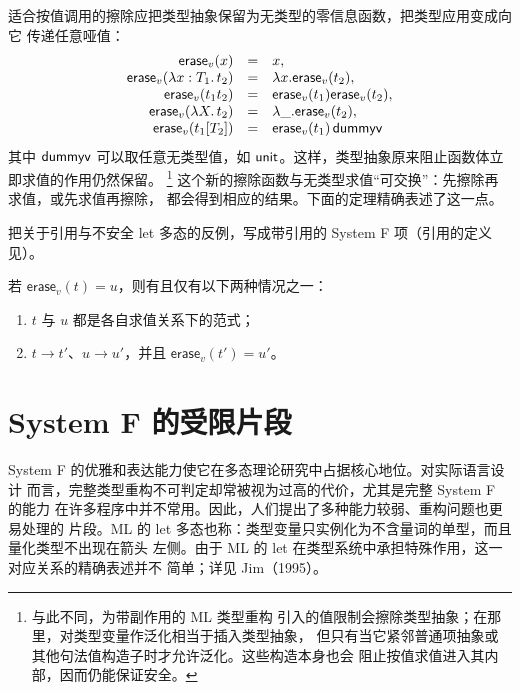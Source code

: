 适合按值调用的擦除应把类型抽象保留为无类型的零信息函数，把类型应用变成向它
传递任意哑值：
\[
\begin{array}{rcl}
\mathsf{erase}_v(x)&=&x,\\
\mathsf{erase}_v(\lambda x:T_1.\,t_2)&=&\lambda x.\mathsf{erase}_v(t_2),\\
\mathsf{erase}_v(t_1t_2)&=&\mathsf{erase}_v(t_1)\mathsf{erase}_v(t_2),\\
\mathsf{erase}_v(\lambda X.\,t_2)&=&\lambda\_.\mathsf{erase}_v(t_2),\\
\mathsf{erase}_v(t_1[T_2])&=&\mathsf{erase}_v(t_1)\,\mathsf{dummyv}
\end{array}
\]
其中 \(\mathsf{dummyv}\) 可以取任意无类型值，如
\(\mathsf{unit}\)。这样，类型抽象原来阻止函数体立即求值的作用仍然保留。
\footnote{与此不同，为带副作用的 ML 类型重构
引入的值限制会擦除类型抽象；在那里，对类型变量作泛化相当于插入类型抽象，
但只有当它紧邻普通项抽象或其他句法值构造子时才允许泛化。这些构造本身也会
阻止按值求值进入其内部，因而仍能保证安全。}
这个新的擦除函数与无类型求值“可交换”：先擦除再求值，或先求值再擦除，
都会得到相应的结果。下面的定理精确表述了这一点。

\begin{exercise}[\(\star\star\)]
\label{ex:23.7.1}
把关于引用与不安全 let 多态的反例，写成带引用的
System F 项（引用的定义见）。
\end{exercise}

\begin{theorem}
\label{thm:23.7.2}
若 \(\mathsf{erase}_v(t)=u\)，则有且仅有以下两种情况之一：
\begin{enumerate}
  \item \(t\) 与 \(u\) 都是各自求值关系下的范式；
  \item \(t\longrightarrow t'\)、\(u\longrightarrow u'\)，并且
        \(\mathsf{erase}_v(t')=u'\)。
\end{enumerate}
\end{theorem}

\section{System F 的受限片段}
\label{sec:23.8}

System F 的优雅和表达能力使它在多态理论研究中占据核心地位。对实际语言设计
而言，完整类型重构不可判定却常被视为过高的代价，尤其是完整 System F 的能力
在许多程序中并不常用。因此，人们提出了多种能力较弱、重构问题也更易处理的
片段。ML 的 let 多态也称：类型变量只实例化为不含量词的单型，而且量化类型不出现在箭头
左侧。由于 ML 的 let 在类型系统中承担特殊作用，这一对应关系的精确表述并不
简单；详见 Jim（1995）。

